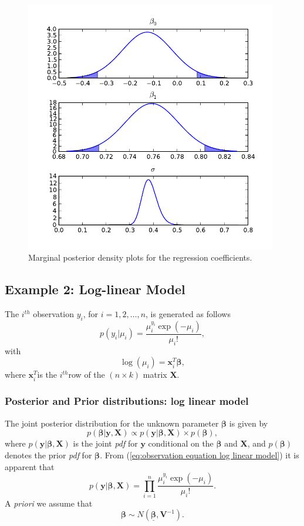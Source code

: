 \documentclass[article]{jss}
\begin{document}
\begin{figure}
  \begin{center}
    \includegraphics[width=11cm]{mpdreg.pdf}
  \end{center}
\caption{Marginal posterior density plots for the regression coefficients.}
\label{Flo:mpd reg}
\end{figure}



\subsection{Example 2: Log-linear Model}
\label{sub:Example-2:-Log-linear}

The $i^{th}$ observation $y_{i}$, for $i=1,2,\dots,n$, is generated
as follows\begin{equation}
p(y_{i}|\mu_{i})=\frac{\mu_{i}^{y_{i}}\exp(-\mu_{i})}{\mu_{i}!},\label{eq:observation equation log linear model}\end{equation}
 with \[
\log(\mu_{i})=\bm{x}_{i}^{T}\bm{\beta},\]
 where $\bm{x}_{i}^{T}$is the $i^{th}$row of the $\left(n\times k\right)$
matrix $\bm{X}.$


\subsubsection{Posterior and Prior distributions: log linear model}

The joint posterior distribution for the unknown parameter $\bm{\beta}$
is given by\begin{equation}
p(\bm{\beta}|\bm{y},\bm{X})\propto p(\bm{y}|\bm{\beta},\bm{X})\times p(\bm{\beta}),\label{eq:post log_linear}\end{equation}
 where $p(\bm{y}|\bm{\beta},\bm{X})$ is the joint \emph{pdf }for
$\bm{y}$ conditional on the $\bm{\beta}$ and $\bm{X}$, and $p(\bm{\beta})$
denotes the prior \emph{pdf }for $\bm{\beta}.$ From (\ref{eq:observation equation log linear model})
it is apparent that\[
p(\bm{y}|\bm{\beta},\bm{X})=\prod_{i=1}^{n}\frac{\mu_{i}^{y_{i}}\exp(-\mu_{i})}{\mu_{i}!}.\]
 A \emph{priori }we assume that \[
\bm{\beta}\sim N(\bm{\underline{\bm{\beta}}},\bm{V}^{-1}).\]
\end{document}
